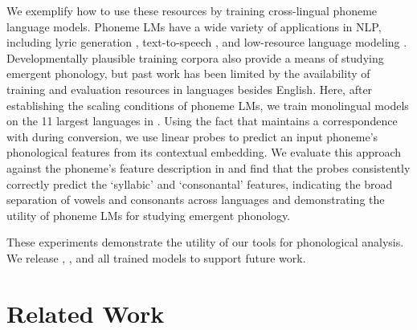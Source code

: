 We exemplify how to use these resources by training cross-lingual phoneme language models. Phoneme LMs have a wide variety of applications in NLP, including lyric generation \citep{ding-2024-songcomposer}, text-to-speech \citep{li-2023-phoneme-level-bert}, and low-resource language modeling \citep{leong-whitenack-2022-phone}. Developmentally plausible training corpora also provide a means of studying emergent phonology, but past work has been limited by the availability of training and evaluation resources in languages besides English. Here, after establishing the scaling conditions of phoneme LMs, we train monolingual models on the 11 largest languages in \ipachildes. Using the fact that \gpp maintains a correspondence with \phoible during conversion, we use linear probes to predict an input phoneme's phonological features from its contextual embedding. We evaluate this approach against the phoneme's feature description in \phoible and find that the probes consistently correctly predict the `syllabic' and `consonantal' features, indicating the broad separation of vowels and consonants across languages and demonstrating the utility of phoneme LMs for studying emergent phonology.

These experiments demonstrate the utility of our tools for phonological analysis. We release \gpp, \ipachildes, and all trained models to support future work.


\section{Related Work}




